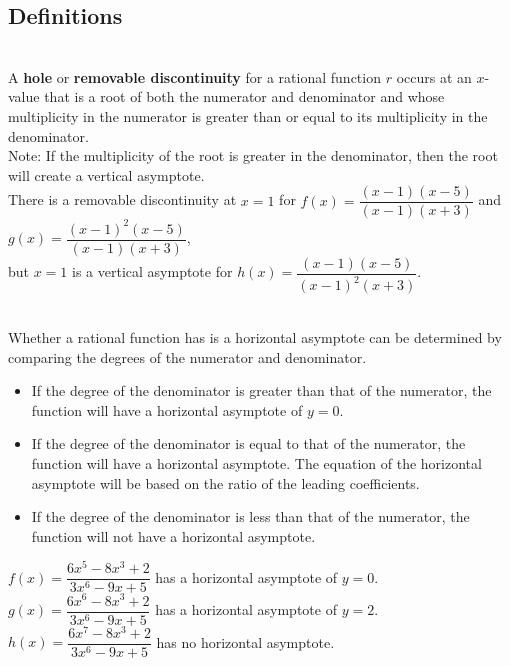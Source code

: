 \subsection*{Definitions} \label{def-functions-rational-graphs}


\begin{myDefinition}~\\[0.5mm]
A {\bf hole} or {\bf removable discontinuity} for a rational function $r$ occurs at an $x$-value that is a root of both the numerator and denominator and whose multiplicity in the numerator is greater than or equal to its multiplicity in the denominator.  \\
Note: If the multiplicity of the root is greater in the denominator, then the root will create a vertical asymptote. \\[0.5em]
 There is a removable discontinuity at $x=1$ for $f(x)=\dfrac{(x-1)(x-5)}{(x-1)(x+3)}$ and $g(x)=\dfrac{(x-1)^2(x-5)}{(x-1)(x+3)}$, \\
but $x=1$ is a vertical asymptote for $h(x)=\dfrac{(x-1)(x-5)}{(x-1)^2(x+3)}$.
\end{myDefinition}


\begin{myDefinition}~\\[0.5mm]
Whether a rational function has is a horizontal asymptote can be determined by comparing the degrees of the numerator and denominator.
\begin{itemize}
\item If the degree of the denominator is greater than that of the numerator, the function will have a horizontal asymptote of $y=0$.
\item If the degree of the denominator is equal to that of the numerator, the function will have a horizontal asymptote.  The equation of the horizontal asymptote will be based on the ratio of the leading coefficients.
\item If the degree of the denominator is less than that of the numerator, the function will not have a horizontal asymptote.
\end{itemize}
 $f(x)=\dfrac{6x^5-8x^3+2}{3x^6-9x+5}$ has a horizontal asymptote of $y=0$.\\[0.5em]
\indent \qquad$g(x)=\dfrac{6x^6-8x^3+2}{3x^6-9x+5}$ has a horizontal asymptote of $y=2$.\\[0.5em]
\indent \qquad$h(x)=\dfrac{6x^7-8x^3+2}{3x^6-9x+5}$ has no horizontal asymptote.
\end{myDefinition}





